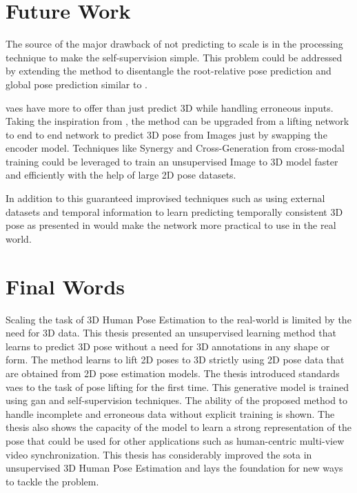 \section{Future Work}

The source of the major drawback of not predicting to scale is in the processing technique to make the self-supervision simple. This problem could be addressed by extending the method to disentangle the root-relative pose prediction and global pose prediction similar to \cite{CameraDistanceAware}. 

\acp{vae} have more to offer than just predict 3D while handling erroneous inputs. Taking the inspiration from \cite{crossmodal}, the method can be upgraded from a lifting network to end to end network to predict 3D pose from Images just by swapping the encoder model. Techniques like Synergy and Cross-Generation from cross-modal training \cite{MMVAE} could be leveraged to train an unsupervised Image to 3D model faster and efficiently with the help of large 2D pose datasets.

In addition to this guaranteed improvised techniques such as using external datasets and temporal information to learn predicting temporally consistent 3D pose as presented in \cite{amazon1} would make the network more practical to use in the real world.

\section{Final Words}

Scaling the task of 3D Human Pose Estimation to the real-world is limited by the need for 3D data. This thesis presented an unsupervised learning method that learns to predict 3D pose without a need for 3D annotations in any shape or form. The method learns to lift 2D poses to 3D strictly using 2D pose data that are obtained from 2D pose estimation models. The thesis introduced standards \acp{vae} to the task of pose lifting for the first time. This generative model is trained using \ac{gan} and self-supervision techniques. The ability of the proposed method to handle incomplete and erroneous data without explicit training is shown. The thesis also shows the capacity of the model to learn a strong representation of the pose that could be used for other applications such as human-centric multi-view video synchronization. This thesis has considerably improved the \ac{sota} in unsupervised 3D Human Pose Estimation and lays the foundation for new ways to tackle the problem.




